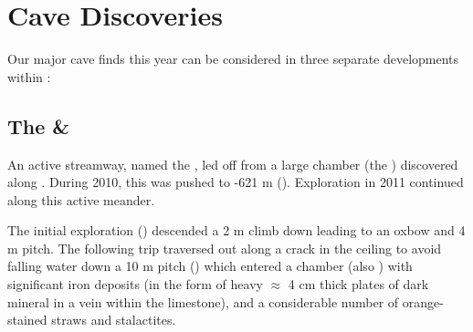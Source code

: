
\section{Cave Discoveries}

Our major cave finds this year can be considered in three separate
developments within :


\subsection{\texorpdfstring{The  \& }{The Serpentine \& Let na Drugi Svet}}

An active streamway, named the , led off from a large
chamber (the ) discovered along . During 2010, this was pushed to -621 m (). Exploration in 2011 continued along this active
meander.

The initial exploration () descended a 2 m climb down leading
to an oxbow and 4 m pitch. The following trip traversed out along a
crack in the ceiling to avoid falling water down a 10 m pitch
() which entered a chamber (also ) with
significant iron deposits (in the form of heavy $\approx$ 4 cm
thick plates of dark mineral in a vein within the limestone), and a
considerable number of orange-stained straws and stalactites.

